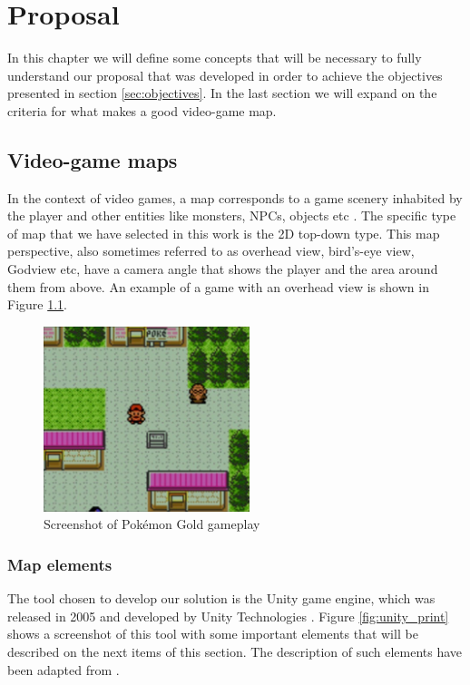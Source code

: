 \chapter{Proposal}
\label{chapter:proposal}

In this chapter we will define some concepts that will be necessary to fully understand our proposal that was developed in order to achieve the objectives presented in section \ref{sec:objectives}. In the last section we will expand on the criteria for what makes a good video-game map.

\section{Video-game maps}

In the context of video games, a map corresponds to a game scenery inhabited by the player and other entities like monsters, NPCs, objects etc \cite{carvalho:2011}. The specific type of map that we have selected in this work is the 2D top-down type. This map perspective, also sometimes referred to as overhead view, bird's-eye view, Godview etc, have a camera angle that shows the player and the area around them from above. An example of a game with an overhead view is shown in Figure \ref{fig:pokemon}.

\begin{figure}[h]
    \caption{Screenshot of Pokémon Gold gameplay}
    \centerline{\includegraphics[width=6cm]{images/proposal/pokemon.png}}
    \label{fig:pokemon}
\end{figure}

\subsection{Map elements}

The tool chosen to develop our solution is the Unity game engine, which was released in 2005 and developed by Unity Technologies \cite{unity:2021}. Figure \ref{fig:unity_print} shows a screenshot of this tool with some important elements that will be described on the next items of this section. The description of such elements have been adapted from \cite{carvalho:2011}.


